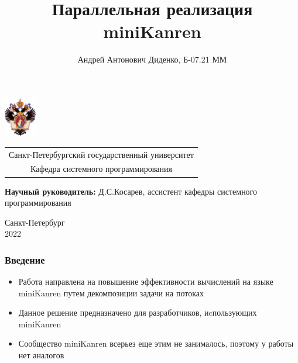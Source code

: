 \documentclass{beamer}
\title[Параллелизация miniKanren]{Параллельная реализация miniKanren}
\institute[СПбГУ]{}
\author[Андрей Диденко]{Андрей Антонович Диденко, Б-07.21 ММ }
\begin{document}
{
\begin{frame}
  \includegraphics[width=1.4cm]{pictures/SPbGU_Logo.png}
  \vspace{-35pt}
  \hspace{-10pt}
  \begin{center}
    \begin{tabular}{c}
      \scriptsize{Санкт-Петербургский государственный университет} \\
      \scriptsize{Кафедра системного программирования}
    \end{tabular}
    \titlepage
  \end{center}

  \btVFill

  {\scriptsize
    {\bfseries Научный руководитель:} Д.С.Косарев, ассистент кафедры системного программирования \\
  }
  \begin{center}
    \vspace{5pt}
    \scriptsize{Санкт-Петербург\\
      2022}
  \end{center}

\end{frame}
}

\begin{frame}[fragile]
  \frametitle{Введение}
  \begin{itemize}
    \item Работа направлена на повышение эффективности вычислений на языке miniKanren путем декомпозиции задачи на потоках
    \item Данное решение предназначено для разработчиков, иcпользующих miniKanren
    \item Сообщество miniKanren всерьез еще этим не занималось, поэтому у работы нет аналогов
  \end{itemize}
\end{frame}
\end{document}

